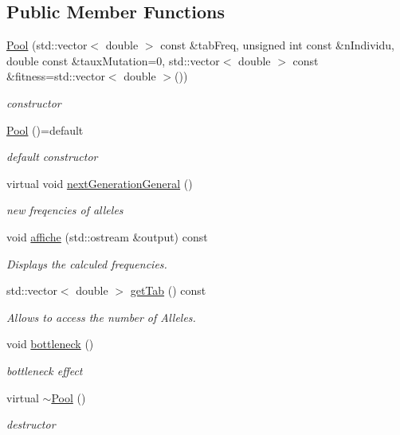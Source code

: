 \subsection*{Public Member Functions}
\begin{DoxyCompactItemize}
\item 
\hyperlink{class_pool_a6dac3ebc3877919011d52813b29ac40d}{Pool} (std\+::vector$<$ double $>$ const \&tab\+Freq, unsigned int const \&n\+Individu, double const \&taux\+Mutation=0, std\+::vector$<$ double $>$ const \&fitness=std\+::vector$<$ double $>$())
\begin{DoxyCompactList}\small\item\em constructor \end{DoxyCompactList}\item 
\hyperlink{class_pool_a9118276ec1fb24c7817a0841ee499de5}{Pool} ()=default
\begin{DoxyCompactList}\small\item\em default constructor \end{DoxyCompactList}\item 
virtual void \hyperlink{class_pool_ad497f611cb592a6dd13f07b217bfd350}{next\+Generation\+General} ()
\begin{DoxyCompactList}\small\item\em new freqencies of alleles \end{DoxyCompactList}\item 
void \hyperlink{class_pool_ac90588d0038d9b0308a0ca22f6765b66}{affiche} (std\+::ostream \&output) const
\begin{DoxyCompactList}\small\item\em Displays the calculed frequencies. \end{DoxyCompactList}\item 
std\+::vector$<$ double $>$ \hyperlink{class_pool_ad8b624c907ee7fccec34c124cb9613fa}{get\+Tab} () const
\begin{DoxyCompactList}\small\item\em Allows to access the number of Alleles. \end{DoxyCompactList}\item 
void \hyperlink{class_pool_a358feab3c6d569ee8044fa41e6da3d74}{bottleneck} ()
\begin{DoxyCompactList}\small\item\em bottleneck effect \end{DoxyCompactList}\item 
virtual \hyperlink{class_pool_a2157e55ddcb79eec5d74468ad49e6324}{$\sim$\+Pool} ()
\begin{DoxyCompactList}\small\item\em destructor \end{DoxyCompactList}\end{DoxyCompactItemize}
